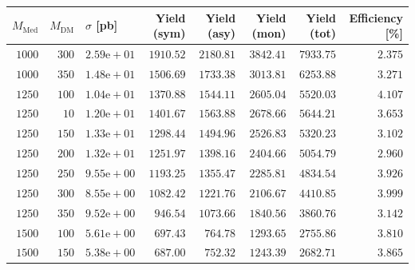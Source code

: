 \begin{table}
    \centering
    {\small
    \begin{tabular}{rrlrrrrr}
    \hline\hline
    $M_{\text{Med}}$ & $M_{\text{DM}}$ & $\sigma$ [pb] & Yield (sym) & Yield (asy) & Yield (mon) & Yield (tot) & Efficiency [\%] \\
    \hline
    $1000$ & $300$ & $2.59\text{e}+01$ & $1910.52$ & $2180.81$ & $3842.41$ & $7933.75$ & $2.375$ \\
    $1000$ & $350$ & $1.48\text{e}+01$ & $1506.69$ & $1733.38$ & $3013.81$ & $6253.88$ & $3.271$ \\
    $1250$ & $100$ & $1.04\text{e}+01$ & $1370.88$ & $1544.11$ & $2605.04$ & $5520.03$ & $4.107$ \\
    $1250$ & $10$ & $1.20\text{e}+01$ & $1401.67$ & $1563.88$ & $2678.66$ & $5644.21$ & $3.653$ \\
    $1250$ & $150$ & $1.33\text{e}+01$ & $1298.44$ & $1494.96$ & $2526.83$ & $5320.23$ & $3.102$ \\
    $1250$ & $200$ & $1.32\text{e}+01$ & $1251.97$ & $1398.16$ & $2404.66$ & $5054.79$ & $2.960$ \\
    $1250$ & $250$ & $9.55\text{e}+00$ & $1193.25$ & $1355.47$ & $2285.81$ & $4834.54$ & $3.926$ \\
    $1250$ & $300$ & $8.55\text{e}+00$ & $1082.42$ & $1221.76$ & $2106.67$ & $4410.85$ & $3.999$ \\
    $1250$ & $350$ & $9.52\text{e}+00$ & $946.54$ & $1073.66$ & $1840.56$ & $3860.76$ & $3.142$ \\
    $1500$ & $100$ & $5.61\text{e}+00$ & $697.43$ & $764.78$ & $1293.65$ & $2755.86$ & $3.810$ \\
    $1500$ & $150$ & $5.38\text{e}+00$ & $687.00$ & $752.32$ & $1243.39$ & $2682.71$ & $3.865$ \\

\end{tabular}}
\end{table}
